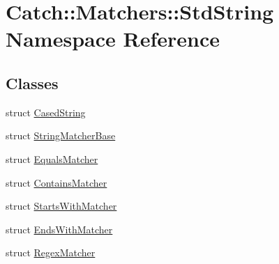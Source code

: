 \hypertarget{namespace_catch_1_1_matchers_1_1_std_string}{\section{Catch\-:\-:Matchers\-:\-:Std\-String Namespace Reference}
\label{namespace_catch_1_1_matchers_1_1_std_string}
}
\subsection*{Classes}
\begin{DoxyCompactItemize}
\item 
struct \hyperlink{struct_catch_1_1_matchers_1_1_std_string_1_1_cased_string}{Cased\-String}
\item 
struct \hyperlink{struct_catch_1_1_matchers_1_1_std_string_1_1_string_matcher_base}{String\-Matcher\-Base}
\item 
struct \hyperlink{struct_catch_1_1_matchers_1_1_std_string_1_1_equals_matcher}{Equals\-Matcher}
\item 
struct \hyperlink{struct_catch_1_1_matchers_1_1_std_string_1_1_contains_matcher}{Contains\-Matcher}
\item 
struct \hyperlink{struct_catch_1_1_matchers_1_1_std_string_1_1_starts_with_matcher}{Starts\-With\-Matcher}
\item 
struct \hyperlink{struct_catch_1_1_matchers_1_1_std_string_1_1_ends_with_matcher}{Ends\-With\-Matcher}
\item 
struct \hyperlink{struct_catch_1_1_matchers_1_1_std_string_1_1_regex_matcher}{Regex\-Matcher}
\end{DoxyCompactItemize}
